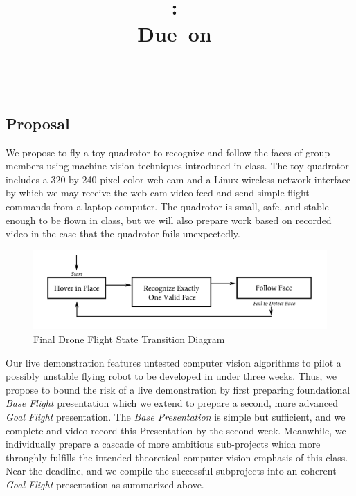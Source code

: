 \documentclass{article}
\title{\vspace{2in}\textmd{\textbf{\hmwkClass:\ \hmwkTitle}}\\\normalsize\vspace{0.1in}\small{Due\ on\ \hmwkDueDate}\\\vspace{0.1in}\large{\textit{\hmwkClassInstructor\ \hmwkClassTime}}\vspace{3in}}
\date{}
\author{\textbf{\hmwkAuthorName}}
\begin{document}
\begin{spacing}{1.1}
\maketitle
\newpage
\tableofcontents
\newpage


\clearpage

\section{Proposal}
We propose to fly a toy quadrotor to recognize and follow the faces of
group members using machine vision techniques introduced in class. The
toy quadrotor includes a 320 by 240 pixel color web cam and a Linux
wireless network interface by which we may receive the web cam video
feed and send simple flight commands from a laptop computer. The
quadrotor is small, safe, and stable enough to be flown in class, but
we will also prepare work based on recorded video in the case that the
quadrotor fails unexpectedly.

\begin{figure}[h!]
  \caption{Final Drone Flight State Transition Diagram}
  \centering
   \includegraphics[width=6in]{quadrotor_state_diagram.pdf}
\end{figure}

Our live demonstration features untested computer vision algorithms to
pilot a possibly unstable flying robot to be developed in under three
weeks. Thus, we propose to bound the risk of a live demonstration by
first preparing foundational \textit{Base Flight} presentation which
we extend to prepare a second, more advanced \textit{Goal Flight}
presentation. The \textit{Base Presentation} is simple but sufficient,
and we complete and video record this Presentation by the second
week. Meanwhile, we individually prepare a cascade of more ambitious
sub-projects which more throughly fulfills the intended theoretical
computer vision emphasis of this class. Near the deadline, and we
compile the successful subprojects into an coherent \textit{Goal
  Flight} presentation as summarized above.


\end{spacing}
\end{document}
